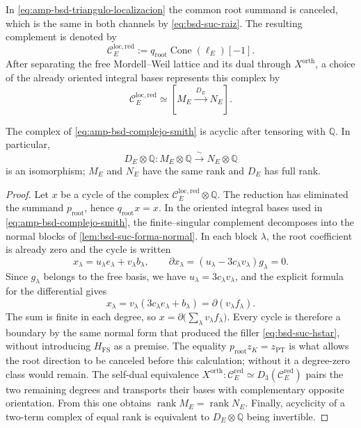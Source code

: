 In \eqref{eq:amp-bsd-triangulo-localizacion} the common root summand
is canceled, which is the same in both channels by
\eqref{eq:bsd-suc-raiz}. The resulting complement is denoted by
\begin{equation}\label{eq:amp-bsd-cono-local-reducido}
 \mathcal C_E^{\mathrm{loc,red}}
 :=q_{\mathrm{root}}\operatorname{Cone}(\ell_E)[-1].
\end{equation}
After separating the free Mordell--Weil lattice and its dual through
\(X^{\mathrm{orth}}\), a choice of the already oriented integral bases
represents this complex by
\begin{equation}\label{eq:amp-bsd-complejo-smith}
 \mathcal C_E^{\mathrm{loc,red}}
 \simeq[M_E\xrightarrow{\ D_E\ }N_E].
\end{equation}

\begin{lemma}
\label{lem:amp-bsd-aciclicidad-rango}
The complex of \eqref{eq:amp-bsd-complejo-smith} is acyclic after
tensoring with \(\mathbb Q\). In particular,
\[
 D_E\otimes\mathbb Q:M_E\otimes\mathbb Q
 \xrightarrow{\ \sim\ }N_E\otimes\mathbb Q
\]
is an isomorphism; \(M_E\) and \(N_E\) have the same rank and \(D_E\) has
full rank.
\end{lemma}

\begin{proof}
Let \(x\) be a cycle of the complex
\(\mathcal C_E^{\mathrm{loc,red}}\otimes\mathbb Q\). The reduction has
eliminated the summand \(p_{\mathrm{root}}\), hence
\(q_{\mathrm{root}}x=x\). In the oriented integral bases used in
\eqref{eq:amp-bsd-complejo-smith}, the finite--singular complement
decomposes into the normal blocks of
\cref{lem:bsd-suc-forma-normal}. In each block \(\lambda\), the root
coefficient is already zero and the cycle is written
\[
 x_{\lambda}=u_{\lambda}e_{\lambda}
                  +v_{\lambda}b_{\lambda},
 \qquad
 \partial x_{\lambda}
   =(u_{\lambda}-3c_{\lambda}v_{\lambda})g_{\lambda}=0.
\]
Since \(g_{\lambda}\) belongs to the free basis, we have
\(u_{\lambda}=3c_{\lambda}v_{\lambda}\), and the explicit formula for the
differential gives
\[
 x_{\lambda}
   =v_{\lambda}(3c_{\lambda}e_{\lambda}+b_{\lambda})
   =\partial(v_{\lambda}f_{\lambda}).
\]
The sum is finite in each degree, so
\(x=\partial\bigl(\sum_{\lambda}v_{\lambda}f_{\lambda}\bigr)\).
Every cycle is therefore a boundary by the same normal form that produced
the filler \eqref{eq:bsd-suc-hstar}, without introducing
\(H_{\mathrm{FS}}\) as a premise. The equality
\(p_{\mathrm{root}}z_K=z_{\mathrm{PT}}\) is what allows the root
direction to be canceled before this calculation; without it a degree-zero
class would remain. The self-dual equivalence
\(X^{\mathrm{orth}}:\mathcal C_E^{\mathrm{red}}\simeq
D_3(\mathcal C_E^{\mathrm{red}})\) pairs the two remaining degrees and
transports their bases with complementary opposite orientation. From this one
obtains \(\operatorname{rank}M_E=\operatorname{rank}N_E\).
Finally, acyclicity of a two-term complex of equal rank
is equivalent to \(D_E\otimes\mathbb Q\) being invertible.
\end{proof}

